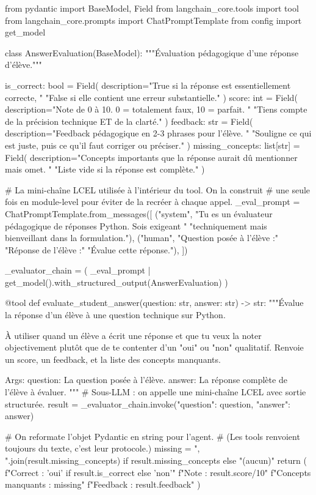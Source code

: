 \documentclass[11pt,a4paper]{article}
\begin{document}
\begin{pythoncode}
from pydantic import BaseModel, Field
from langchain_core.tools import tool
from langchain_core.prompts import ChatPromptTemplate
from config import get_model


class AnswerEvaluation(BaseModel):
    """Évaluation pédagogique d'une réponse d'élève."""

    is_correct: bool = Field(
        description="True si la réponse est essentiellement correcte, "
                    "False si elle contient une erreur substantielle."
    )
    score: int = Field(
        description="Note de 0 à 10. 0 = totalement faux, 10 = parfait. "
                    "Tiens compte de la précision technique ET de la clarté."
    )
    feedback: str = Field(
        description="Feedback pédagogique en 2-3 phrases pour l'élève. "
                    "Souligne ce qui est juste, puis ce qu'il faut corriger ou préciser."
    )
    missing_concepts: list[str] = Field(
        description="Concepts importants que la réponse aurait dû mentionner mais omet. "
                    "Liste vide si la réponse est complète."
    )


# La mini-chaîne LCEL utilisée à l'intérieur du tool. On la construit
# une seule fois en module-level pour éviter de la recréer à chaque appel.
_eval_prompt = ChatPromptTemplate.from_messages([
    ("system",
     "Tu es un évaluateur pédagogique de réponses Python. Sois exigeant "
     "techniquement mais bienveillant dans la formulation."),
    ("human",
     "Question posée à l'élève :\n\n"
     "Réponse de l'élève :\n\n"
     "Évalue cette réponse."),
])

_evaluator_chain = (
    _eval_prompt
    | get_model().with_structured_output(AnswerEvaluation)
)


@tool
def evaluate_student_answer(question: str, answer: str) -> str:
    """Évalue la réponse d'un élève à une question technique sur Python.

    À utiliser quand un élève a écrit une réponse et que tu veux la noter
    objectivement plutôt que de te contenter d'un "oui" ou "non" qualitatif.
    Renvoie un score, un feedback, et la liste des concepts manquants.

    Args:
        question: La question posée à l'élève.
        answer: La réponse complète de l'élève à évaluer.
    """
    # Sous-LLM : on appelle une mini-chaîne LCEL avec sortie structurée.
    result = _evaluator_chain.invoke({"question": question, "answer": answer})

    # On reformate l'objet Pydantic en string pour l'agent.
    # (Les tools renvoient toujours du texte, c'est leur protocole.)
    missing = ", ".join(result.missing_concepts) if result.missing_concepts else "(aucun)"
    return (
        f"Correct : {'oui' if result.is_correct else 'non'}\n"
        f"Note : {result.score}/10\n"
        f"Concepts manquants : {missing}\n"
        f"Feedback : {result.feedback}"
    )
\end{pythoncode}
\end{document}
